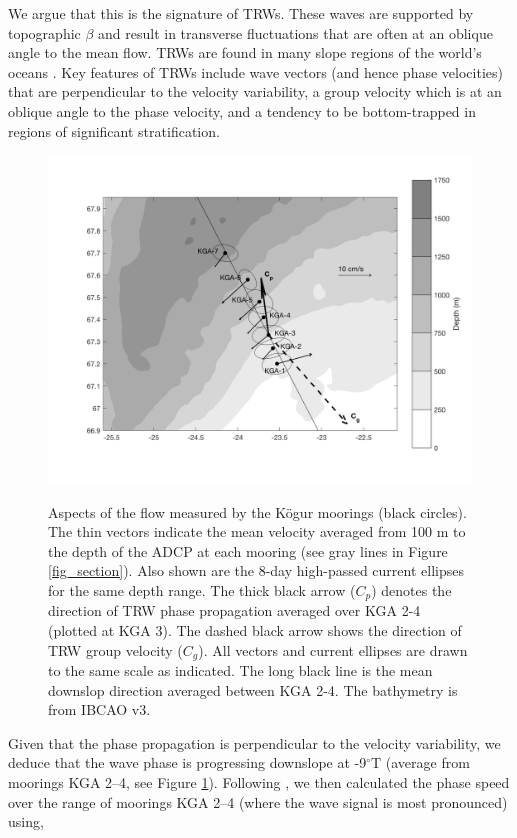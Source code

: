 \documentclass[12pt,titlepage,figuresatend]{article}
\begin{document}
We argue that this is the signature of TRWs. These waves are supported by topographic $\beta$ and result in transverse fluctuations that are often at an oblique angle to the mean flow. TRWs are found in many slope regions of the world’s oceans \cite[]{Garrett1979,Louis1982,Pickart1990}. Key features of TRWs include wave vectors (and hence phase velocities) that are perpendicular to the velocity variability, a group velocity which is at an oblique angle to the phase velocity, and a tendency to be bottom-trapped in regions of significant stratification.

\begin{figure}[ht!]
  \centering\includegraphics[width=\hsize]{./figures/map_ellipse.pdf}
  \caption{Aspects of the flow measured by the K\"{o}gur moorings (black circles). The thin vectors indicate the mean velocity averaged from 100 m to the depth of the ADCP at each mooring (see gray lines in Figure \ref{fig_section}). Also shown are the 8-day high-passed current ellipses for the same depth range. The thick black arrow ($C_{p}$) denotes the direction of TRW phase propagation averaged over KGA 2-4 (plotted at KGA 3). The dashed black arrow shows the direction of TRW group velocity ($C_{g}$). All vectors and current ellipses are drawn to the same scale as indicated. The long black line is the mean downslop direction averaged between KGA 2-4. The bathymetry is from IBCAO v3.}{\label{fig_ellipse}}
\end{figure}

Given that the phase propagation is perpendicular to the velocity variability, we deduce that the wave phase is progressing downslope at -9$^{\circ}$T (average from moorings KGA 2--4, see Figure \ref{fig_ellipse}). Following \cite{Pickart1990}, we then calculated the phase speed over the range of moorings KGA 2--4 (where the wave signal is most pronounced) using,
\end{document}
